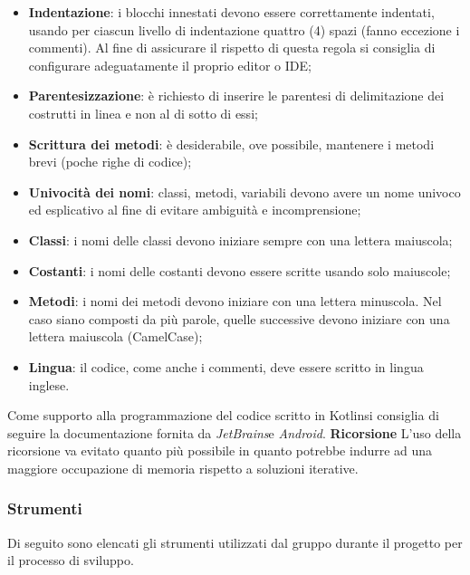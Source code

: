 			\begin{itemize}
				\item \textbf{Indentazione}: i blocchi innestati devono essere correttamente indentati, usando per ciascun livello di indentazione quattro (4) spazi (fanno eccezione i commenti). Al fine di assicurare il rispetto di questa regola si consiglia di configurare adeguatamente il proprio editor o IDE;
				\item \textbf{Parentesizzazione}: è richiesto di inserire le parentesi di delimitazione dei costrutti in linea e non al di sotto di essi;
				\item \textbf{Scrittura dei metodi}: è desiderabile, ove possibile, mantenere i metodi brevi (poche righe di codice);
				\item \textbf{Univocità dei nomi}: classi, metodi, variabili devono avere un nome univoco	ed esplicativo al fine di evitare ambiguità e incomprensione;
				\item \textbf{Classi}: i nomi delle classi devono iniziare sempre con una lettera maiuscola;
				\item \textbf{Costanti}: i nomi delle costanti devono essere scritte usando solo maiuscole;
				\item \textbf{Metodi}: i nomi dei metodi devono iniziare con una lettera minuscola. Nel caso
				siano composti da più parole, quelle successive devono iniziare con una lettera maiuscola (CamelCase\glo{});
				\item \textbf{Lingua}: il codice, come anche i commenti, deve essere scritto in lingua inglese.
			\end{itemize}
			Come supporto alla programmazione del codice scritto in Kotlin\glosp si consiglia di seguire la documentazione fornita da \textit{JetBrains}\glosp e \textit{Android}\glo. \newline \newline
			\textbf{Ricorsione} \newline \newline
			L'uso della ricorsione va evitato quanto più possibile in  quanto  potrebbe
			indurre  ad  una  maggiore  occupazione  di  memoria  rispetto  a  soluzioni
			iterative.
	\subsubsection{Strumenti}
	Di seguito sono elencati gli strumenti utilizzati dal gruppo durante il progetto per il processo di sviluppo.	
